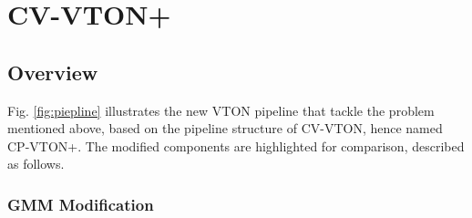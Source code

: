 

\section{CV-VTON+} \label{section:cpvton+}

\subsection{Overview} 

Fig. \ref{fig:piepline} illustrates the new VTON pipeline that tackle the problem mentioned above, based on the pipeline structure of CV-VTON, hence named CP-VTON+. The modified components are highlighted for comparison, described as follows.

\subsubsection{GMM Modification}

